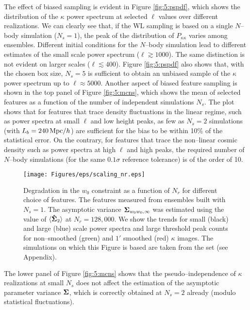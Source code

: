 %
The effect of biased sampling is evident in Figure \ref{fig:5:pspdf}, which shows the distribution of the $\kappa$ power spectrum at selected $\ell$ values over different realizations. We can clearly see that, if the WL sampling is based on a single $N$--body simulation ($N_s=1$), the peak of the distribution of $P_{\kappa\kappa}$ varies among ensembles. Different initial conditions  for the $N$--body simulation lead to different estimates of the small scale power spectrum ($\ell\gtrsim 1000$). The same distinction is not evident on larger scales ($\ell\lesssim 400$). Figure \ref{fig:5:pspdf} also shows that, with the chosen box size, $N_s=5$ is sufficient to obtain an unbiased sample of the $\kappa$ power spectrum up to $\ell\approx5000$. Another aspect of biased feature sampling is shown in the top panel of Figure \ref{fig:5:mcns}, which shows the mean of selected features as a function of the number of independent simulations $N_s$. The plot shows that for features that trace density fluctuations in the linear regime, such as power spectra at small $\ell$ and low height peaks, as few as $N_s=2$ simulations (with $L_b=240\,{\rm Mpc}/h$) are sufficient for the bias to be within 10\% of the statistical error. On the contrary, for features that trace the non--linear cosmic density such as power spectra at high $\ell$ and high peaks, the required number of $N$--body simulations (for the same $0.1\sigma$ reference tolerance) is of the order of 10.    
%
\begin{figure}
\begin{center}
\texttt{[image: Figures/eps/scaling\_nr.eps]}
\end{center}
\caption{Degradation in the $w_0$ constraint as a function of $N_r$ for different choice of features. The features measured from ensembles built with $N_s=1$. The asymptotic variance $\mathbf{\Sigma}_{w_0w_0,\infty}$ was estimated using the value of $\langle\mathbf{\hat{\Sigma}}_2\rangle$ at $N_r=128,000$. We show the trends for small (black) and large (blue) scale power spectra and large threshold peak counts for non--smoothed (green) and $1'$ smoothed (red) $\kappa$ images. The simulations on which this Figure is based are taken from the  set (see Appendix).}
\label{fig:5:pseudonr}
\end{figure}
%
The lower panel of Figure \ref{fig:5:mcns} shows that the pseudo--independence of $\kappa$ realizations at small $N_s$ does not affect the estimation of the asymptotic parameter variance $\mathbf{\Sigma}$, which is correctly obtained at $N_s=2$ already (modulo statistical fluctuations). 

